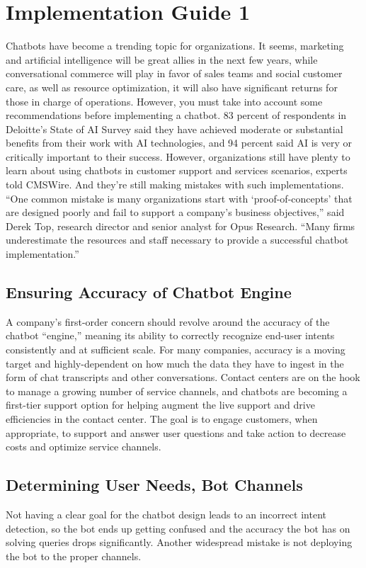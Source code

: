 \documentclass[9pt,software]{livecoms}
\begin{document}
\section{Implementation Guide 1}
Chatbots have become a trending topic for organizations. It seems, marketing and artificial intelligence will be great allies in the next few years, while conversational commerce will play in favor of sales teams and social customer care, as well as resource optimization, it will also have significant returns for those in charge of operations. However, you must take into account some recommendations before implementing a chatbot.
83 percent of respondents in Deloitte’s State of AI Survey said they have achieved moderate or substantial benefits from their work with AI technologies, and 94 percent said AI is very or critically important to their success.
However, organizations still have plenty to learn about using chatbots in customer support and services scenarios, experts told CMSWire. And they're still making mistakes with such implementations. “One common mistake is many organizations start with ‘proof-of-concepts’ that are designed poorly and fail to support a company’s business objectives,” said Derek Top, research director and senior analyst for Opus Research. “Many firms underestimate the resources and staff necessary to provide a successful chatbot implementation.”
\subsection{Ensuring Accuracy of Chatbot Engine}
A company’s first-order concern should revolve around the accuracy of the chatbot “engine,” meaning its ability to correctly recognize end-user intents consistently and at sufficient scale. For many companies, accuracy is a moving target and highly-dependent on how much the data they have to ingest in the form of chat transcripts and other conversations. Contact centers are on the hook to manage a growing number of service channels, and chatbots are becoming a first-tier support option for helping augment the live support and drive efficiencies in the contact center. The goal is to engage customers, when appropriate, to support and answer user questions and take action to decrease costs and optimize service channels.

\subsection{Determining User Needs, Bot Channels}
Not having a clear goal for the chatbot design leads to an incorrect intent detection, so the bot ends up getting confused and the accuracy the bot has on solving queries drops significantly. Another widespread mistake is not deploying the bot to the proper channels.
\end{document}
